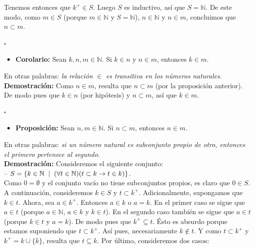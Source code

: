 \documentclass[10 pt]{article}
\begin{document}
{{Tenemos entonces que $k^+ \in S$. Luego $S$ es inductivo, así que $S=\mathbb N$. De este modo, como $m \in S$ (porque $m \in \mathbb N$ y $S=\mathbb N$), $n \in \mathbb N$ y $n \in m$, concluimos que $n \subset m$.} \\

\begin{flushright}
    $\square$
\end{flushright}

\begin{itemize}
    \item \Large{\textbf{Corolario:} Sean $k,n,m \in \mathbb N$. Si $k \in n$ y $n \in m$, entonces $k \in m$.} \\
\end{itemize}

\Large{En otras palabras: \textit{la relación $\in$ es transitiva en los números naturales}.} \\

\Large{\textbf{Demostración:} Como $n \in m$, resulta que $n \subset m$ (por la proposición anterior). De modo pues que $k \in n$ (por hipótesis) y $n \subset m$, así que $k \in m$.} \\

\begin{flushright}
    $\square$
\end{flushright}

\begin{itemize}
    \item \Large{\textbf{Proposición:} Sean $n,m \in \mathbb N$. Si $n \subset m$, entonces $n \in m$.} \\
\end{itemize}

\Large{En otras palabras: \textit{si un número natural es subconjunto propio de otro, entonces el primero pertenece al segundo}.} \\

\Large{\textbf{Demostración:} Consideremos el siguiente conjunto: \\

-- $S=\{k \in \mathbb N \hspace{0.2 cm}| \hspace{0.2 cm} (\forall t \in \mathbb N)(t \subset k \rightarrow t \in k)\}$. \\

Como $0=\emptyset$ y el conjunto vacío no tiene subconjuntos propios, es claro que $0 \in S$. A continuación, consideremos $k \in S$ y $t \subset k^+$. Adicionalmente, supongamos que $k \in t$. Ahora, sea $a \in k^+$. Entonces $a \in k$ o $a=k$. En el primer caso se sigue que $a \in t$ (porque $a \in \mathbb N$, $a \in k$ y $k \in t$). En el segundo caso también se sigue que $a \in t$ (porque $k \in t$ y $a=k$). De modo pues que $k^+ \subseteq t$. Ésto es absurdo porque estamos suponiendo que $t \subset k^+$. Así pues, necesariamente $k \notin t$. Y como $t \subset k^+$ y $k^+=k \cup \{k\}$, resulta que $t \subseteq k$. Por último, consideremos dos casos: \\

}}
\end{document}
